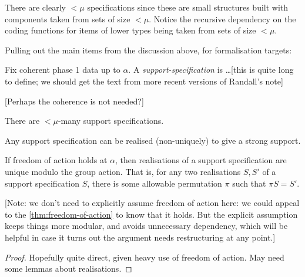 There are clearly $<\mu$ specifications since these are small structures built with components taken from sets of size $<\mu$.  Notice the recursive dependency on the coding functions for items of lower types being taken from sets of size $<\mu$.

Pulling out the main items from the discussion above, for formalisation targets:

\begin{definition}
  \label{def:support-spec}
  Fix coherent phase 1 data up to $\alpha$.  A \emph{support-specification} is \ldots [this is quite long to define; we should get the text from more recent versions of Randall’s note]

  [Perhaps the coherence is not needed?]
\end{definition}

\begin{lemma}
  \label{lem:count-support-specs}
  There are $<\mu$-many support specifications.
\end{lemma}

\begin{definition}
  \label{def:support-spec-realisation}
  Any support specification can be realised (non-uniquely) to give a strong support.
\end{definition}

\begin{lemma}
  \label{lem:support-spec-realisation-unique}
  If freedom of action holds at $\alpha$, then realisations of a support specification are unique modulo the group action.  That is, for any two realisations $S, S'$ of a support specification $S$, there is some allowable permutation $\pi$ such that $\pi S = S'$.

  [Note: we don’t need to explicitly assume freedom of action here: we could appeal to the \cref{thm:freedom-of-action} to know that it holds.  But the explicit assumption keeps things more modular, and avoids unnecessary dependency, which will be helpful in case it turns out the argument needs restructuring at any point.]
\end{lemma}

\begin{proof}
  Hopefully quite direct, given heavy use of freedom of action.  May need some lemmas about realisations.
\end{proof}

